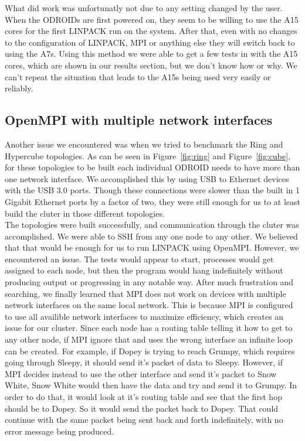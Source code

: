 What did work was unfortunatly not due to any setting changed by the user. When the ODROIDs are first powered on, they seem to be willing to use the A15 cores for the first LINPACK run on the system. After that, even with no changes to the configuration of LINPACK, MPI or anything else they will switch back to using the A7s. Using this method we were able to get a few tests in with the A15 cores, which are shown in our results section, but we don't know how or why. We can't repeat the situation that leads to the A15s being used very easily or reliably.

\subsection{OpenMPI with multiple network interfaces}

Another issue we encountered was when we tried to benchmark the Ring and Hypercube topologies. As can be seen in Figure~\ref{fig:ring} and Figure~\ref{fig:cube}, for these topologies to be built each individual ODROID needs to have more than one network interface. We accomplished this by using USB to Ethernet devices with the USB 3.0 ports. Though these connections were slower than the built in 1 Gigabit Ethernet ports by a factor of two, they were still enough for us to at least build the cluter in those different topologies. \\

The topologies were built successfully, and communication through the cluter was accomplished. We were able to SSH from any one node to any other. We believed that that would be enough for us to run LINPACK using OpenMPI. However, we encountered an issue. The tests would appear to start, processes would get assigned to each node, but then the program would hang indefinitely without producing output or progressing in any notable way. After much frustration and searching, we finally learned that MPI does not work on devices with multiple network interfaces on the same local network. This is because MPI is configured to use all availible network interfaces to maximize efficiency, which creates an issue for our cluster. Since each node has a routing table telling it how to get to any other node, if MPI ignore that and uses the wrong interface an infinite loop can be created. For example, if Dopey is trying to reach Grumpy, which requires going through Sleepy, it should send it's packet of data to Sleepy. However, if MPI decides instead to use the other interface and send it's packet to Snow White, Snow White would then have the data and try and send it to Grumpy. In order to do that, it would look at it's routing table and see that the first hop should be to Dopey. So it would send the packet back to Dopey. That could continue with the same packet being sent back and forth indefinitely, with no error message being produced. \\

